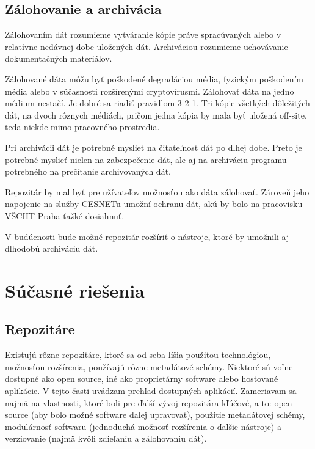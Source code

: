 \documentclass[thesis=M,slovak]{FITthesis}[2013/05/06]
\begin{document}
\section{Zálohovanie a archivácia}
Zálohovaním dát rozumieme vytváranie kópie práve spracúvaných alebo v relatívne nedávnej dobe uložených dát. Archiváciou rozumieme uchovávanie dokumentačných materiálov.

Zálohované dáta môžu byť poškodené degradáciou média, fyzickým poškodením média alebo v súčasnosti rozšírenými cryptovírusmi. Zálohovať dáta na jedno médium nestačí. Je dobré sa riadiť pravidlom 3-2-1. Tri kópie všetkých dôležitých dát, na dvoch rôznych médiách, pričom jedna kópia by mala byť uložená off-site, teda niekde mimo pracovného prostredia. \cite{zalohovanie}

Pri archivácii dát je potrebné myslieť na čitateľnosť dát po dlhej dobe. Preto je potrebné myslieť nielen na zabezpečenie dát, ale aj na archiváciu programu potrebného na prečítanie archivovaných dát.

Repozitár by mal byť pre užívateľov možnosťou ako dáta zálohovať. Zároveň jeho napojenie na služby CESNETu umožní ochranu dát, akú by bolo na pracovisku VŠCHT Praha ťažké dosiahnuť.

V budúcnosti bude možné repozitár rozšíriť o nástroje, ktoré by umožnili aj dlhodobú archiváciu dát.

\chapter{Súčasné riešenia}
\section{Repozitáre}
Existujú rôzne repozitáre, ktoré sa od seba líšia použitou technológiou, možnosťou rozšírenia, používajú rôzne metadátové schémy. Niektoré sú voľne dostupné ako open source, iné ako proprietárny software alebo hosťované aplikácie. V tejto časti uvádzam prehľad dostupných aplikácií. Zameriavam sa najmä na vlastnosti, ktoré boli pre ďalší vývoj repozitára kľúčové, a to: open source (aby bolo možné software ďalej upravovať), použitie metadátovej schémy, modulárnosť softwaru (jednoduchá možnosť rozšírenia o ďalšie nástroje) a verziovanie (najmä kvôli zdieľaniu a zálohovaniu dát).

\end{document}
